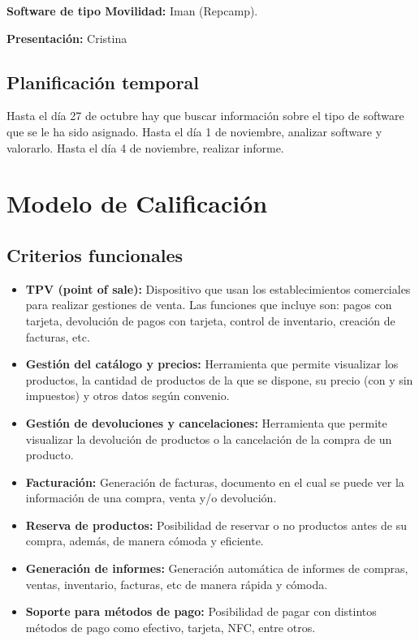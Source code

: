\documentclass{article}
\begin{document}
\textbf{Software de tipo Movilidad:} Iman (Repcamp). 

\textbf{Presentación:} Cristina 

 

\subsection{Planificación temporal}

Hasta el día 27 de octubre hay que buscar información sobre el tipo de software que se le ha sido asignado. 
Hasta el día 1 de noviembre, analizar software y valorarlo. 
Hasta el día 4 de noviembre, realizar informe.


\section{Modelo de Calificación}

\subsection{Criterios funcionales}

\begin{itemize}
	\item \textbf{TPV (point of sale):} Dispositivo que usan los establecimientos comerciales para realizar gestiones de venta. Las funciones que incluye son: pagos con tarjeta, devolución de pagos con tarjeta, control de inventario, creación de facturas, etc. 
	\item \textbf{Gestión del catálogo y precios:} Herramienta que permite visualizar los productos, la cantidad de productos de la que se dispone, su precio (con y sin impuestos) y otros datos según convenio. 
	\item \textbf{Gestión de devoluciones y cancelaciones:} Herramienta que permite visualizar la devolución de productos o la cancelación de la compra de un producto. 
	\item \textbf{Facturación:} Generación de facturas, documento en el cual se puede ver la información de una compra, venta y/o devolución. 
	\item \textbf{Reserva de productos:} Posibilidad de reservar o no productos antes de su compra, además, de manera cómoda y eficiente.
	\item \textbf{Generación de informes:} Generación automática de informes de compras, ventas, inventario, facturas, etc de manera rápida y cómoda.
	\item \textbf{Soporte para métodos de pago:} Posibilidad de pagar con distintos métodos de pago como efectivo, tarjeta, NFC, entre otros.
\end{itemize}
\end{document}
